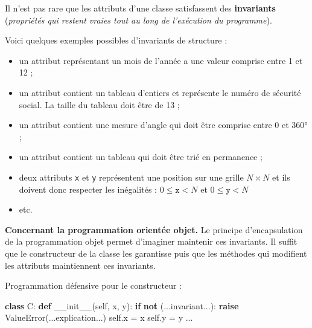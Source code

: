 \documentclass[a4paper,17pt]{extarticle}
\providecommand{\tightlist}{%
      \setlength{\itemsep}{0pt}\setlength{\parskip}{0pt}}
\newenvironment{Shaded}{}{}
\newcommand{\KeywordTok}[1]{\textcolor[rgb]{0.00,0.44,0.13}{\textbf{{#1}}}}
\newcommand{\StringTok}[1]{\textcolor[rgb]{0.25,0.44,0.63}{{#1}}}
\newcommand{\FunctionTok}[1]{\textcolor[rgb]{0.02,0.16,0.49}{{#1}}}
\newcommand{\NormalTok}[1]{{#1}}
\newcommand{\VariableTok}[1]{\textcolor[rgb]{0.10,0.09,0.49}{{#1}}}
\newcommand{\ControlFlowTok}[1]{\textcolor[rgb]{0.00,0.44,0.13}{\textbf{{#1}}}}
\newcommand{\OperatorTok}[1]{\textcolor[rgb]{0.40,0.40,0.40}{{#1}}}
\newcommand{\PreprocessorTok}[1]{\textcolor[rgb]{0.74,0.48,0.00}{{#1}}}
\begin{document}
    Il n'est pas rare que les attributs d'une classe satisfassent des
\textbf{invariants} (\emph{propriétés qui restent vraies tout au long de
l'exécution du programme}).
\begin{exemple}
    Voici quelques exemples possibles d'invariants de structure :

\begin{itemize}
\tightlist
\item
  un attribut représentant un mois de l'année a une valeur comprise
  entre 1 et 12 ;
\item
  un attribut contient un tableau d'entiers et représente le numéro de
  sécurité social. La taille du tableau doit être de 13 ;
\item
  un attribut contient une mesure d'angle qui doit être comprise entre 0
  et 360° ;
\item
  un attribut contient un tableau qui doit être trié en permanence ;
\item
  deux attributs \texttt{x} et \texttt{y} représentent une position sur
  une grille \(N \times N\) et ils doivent donc respecter les inégalités
  : \(0 \leq \texttt{x} < N\) et \(0 \leq \texttt{y} < N\)
\item
  etc.
\end{itemize}

        \end{exemple}\begin{remarque}
    \textbf{Concernant la programmation orientée objet.} Le principe
d'encapsulation de la programmation objet permet d'imaginer maintenir
ces invariants. Il suffit que le constructeur de la classe les
garantisse puis que les méthodes qui modifient les attributs
maintiennent ces invariants.

        \end{remarque}\begin{exemple}
    Programmation défensive pour le constructeur :

\begin{Shaded}
\begin{Highlighting}[]
\KeywordTok{class}\NormalTok{ C:}
    \KeywordTok{def} \FunctionTok{\_\_init\_\_}\NormalTok{(}\VariableTok{self}\NormalTok{, x, y):}
        \ControlFlowTok{if} \KeywordTok{not}\NormalTok{ (...invariant...):}
            \ControlFlowTok{raise} \PreprocessorTok{ValueError}\NormalTok{(}\StringTok{\textquotesingle{}...explication...\textquotesingle{}}\NormalTok{)}
        \VariableTok{self}\NormalTok{.x }\OperatorTok{=}\NormalTok{ x}
        \VariableTok{self}\NormalTok{.y }\OperatorTok{=}\NormalTok{ y}
\NormalTok{    ...}
\end{Highlighting}
\end{Shaded}


\end{exemple}
\end{document}
